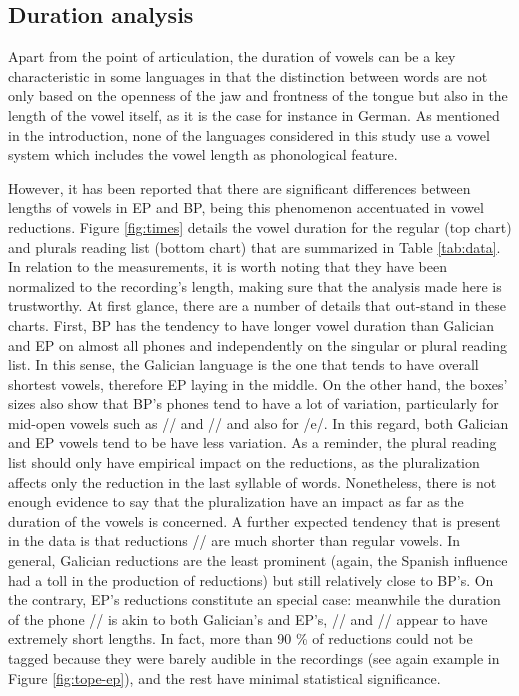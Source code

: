 \documentclass[a4paper,11pt]{article}
\begin{document}
  \subsection{Duration analysis}
  
Apart from the point of articulation, the duration of vowels can be a key characteristic in some languages in that the distinction between words are not only based on the openness of the jaw and frontness of the tongue but also in the length of the vowel itself, as it is the case for instance in German. As mentioned in the introduction, none of the languages considered in this study
use a vowel system which includes the vowel length as phonological feature.

 However, it has been reported that there are significant differences between lengths of vowels in EP and BP, being this phenomenon accentuated in vowel reductions. Figure \ref{fig:times} details the vowel duration for the regular (top chart) and plurals reading list (bottom chart) that are summarized in Table \ref{tab:data}. In relation to the measurements, it is worth noting that they have been normalized to the recording's length, making sure that the analysis made here is trustworthy. At first glance, there are a number of details that out-stand in these charts. First, BP has the tendency to have longer vowel duration than Galician and EP on almost all phones and independently on the singular or plural reading list. In this sense, the Galician language is the one that tends to have overall shortest vowels, therefore EP laying in the middle. On the other hand, the boxes' sizes also show that BP's phones tend to have a lot of variation, particularly for mid-open vowels such as // and // and also for /e/. In this regard, both Galician and EP vowels tend to be have less variation. As a reminder, the plural reading list should only have empirical impact on the reductions, as the pluralization affects only the reduction in the last syllable of words. Nonetheless, there is not enough evidence to say that the pluralization have an impact as far as the duration of the vowels is concerned. A further expected tendency that is present in the data is that reductions // are much shorter than regular vowels. In general, Galician reductions are the least prominent (again, the Spanish influence had a toll in the production of reductions) but still relatively close to BP's. On the contrary, EP's reductions constitute an special case: meanwhile the duration of the phone // is akin to both Galician's and EP's, // and // appear to have extremely short lengths. In fact, more than 90 \% of reductions could not be tagged because they were barely audible in the recordings (see again example in Figure \ref{fig:tope-ep}), and the rest have minimal statistical significance.
 
\end{document}
